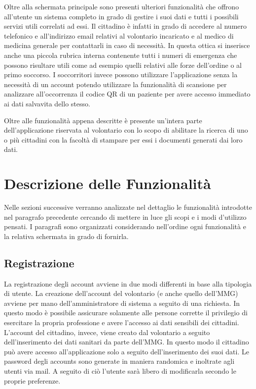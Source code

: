 \documentclass[12pt,a4paper,twoside,openright,titlepage]{book}
\begin{document}
Oltre alla schermata principale sono presenti ulteriori funzionalità che offrono all'utente un sistema completo in grado di gestire i suoi dati e tutti i possibili servizi utili correlati ad essi. Il cittadino è infatti in grado di accedere al numero telefonico e all'indirizzo email relativi al volontario incaricato e al medico di medicina generale per contattarli in caso di necessità. In questa ottica si inserisce anche una piccola rubrica interna contenente tutti i numeri di emergenza che possono risultare utili come ad esempio quelli relativi alle forze dell'ordine o al primo soccorso. I soccorritori invece possono utilizzare l'applicazione senza la necessità di un account potendo utilizzare la funzionalità di scansione per analizzare all'occorrenza il codice QR di un paziente per avere accesso immediato ai dati salvavita dello stesso.\newline

Oltre alle funzionalità appena descritte è presente un'intera parte dell'applicazione riservata al volontario con lo scopo di abilitare la ricerca di uno o più cittadini con la facoltà di stampare per essi i documenti generati dai loro dati.

\section{Descrizione delle Funzionalità}
Nelle sezioni successive verranno analizzate nel dettaglio le funzionalità introdotte nel paragrafo precedente cercando di mettere in luce gli scopi e i modi d'utilizzo pensati. I paragrafi sono organizzati considerando nell'ordine ogni funzionalità e la relativa schermata in grado di fornirla.

\subsection{Registrazione}
La registrazione degli account avviene in due modi differenti in base alla tipologia di utente. La creazione dell'account del volontario (e anche quello dell'MMG) avviene per mano dell'amministratore di sistema a seguito di una richiesta. In questo modo è possibile assicurare solamente alle persone corrette il privilegio di esercitare la propria professione e avere l'accesso ai dati sensibili dei cittadini. L'account del cittadino, invece, viene creato dal volontario a seguito dell'inserimento dei dati sanitari da parte dell'MMG. In questo modo il cittadino può avere accesso all'applicazione solo a seguito dell'inserimento dei suoi dati.\newline
Le password degli accounts sono generate in maniera randomica e inoltrate agli utenti via mail. A seguito di ciò l'utente sarà libero di modificarla secondo le proprie preferenze.
\end{document}
